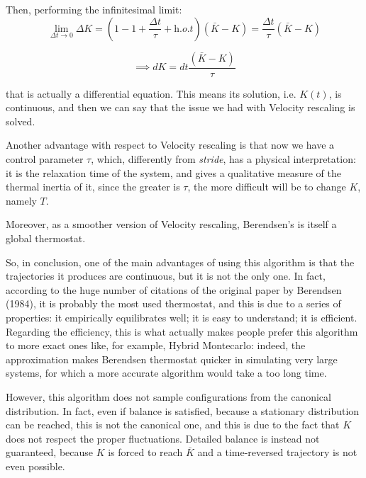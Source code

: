 Then, performing the infinitesimal limit:
\begin{equation*}
    \lim_{{\Delta t}\to 0} \Delta K = (1-1+\frac{\Delta t}{\tau} + \textit{h.o.t})(\bar K-K)=\frac{\Delta t}{\tau}(\bar K-K)
\end{equation*}

\begin{equation}
    \implies dK=dt \frac{(\bar K-K)}{\tau}
\end{equation}

that is actually a differential equation. This means its solution, i.e. $K(t)$, is continuous, and then we can say that the issue we had with Velocity rescaling is solved.

Another advantage with respect to Velocity rescaling is that now we have a control parameter $\tau$, which, differently from \textit{stride}, has a physical interpretation:
it is the relaxation time of the system, and gives a qualitative measure of the thermal inertia of it, since the greater is $\tau$, the more difficult will be to change $K$, namely $T$.

Moreover, as a smoother version of Velocity rescaling, Berendsen's is itself a global thermostat.

So, in conclusion, one of the main advantages of using this algorithm is that the trajectories it produces are continuous, but it is not the only one. In fact, according to the huge number of citations of the original paper by Berendsen (1984), it is probably the most used thermostat, and this is due to a series of properties: it empirically equilibrates well; it is easy to understand; it is efficient. Regarding the efficiency, this is what actually makes people prefer this algorithm to more exact ones like, for example, Hybrid Montecarlo: indeed, the approximation makes Berendsen thermostat quicker in simulating very large systems, for  which a more accurate algorithm would take a too long time.

However, this algorithm does not sample configurations from the canonical distribution. In fact, even if balance is satisfied, because a stationary distribution can be reached, this is not the canonical one, and this is due to the fact that $K$ does not respect the proper fluctuations. Detailed balance is instead not guaranteed, because $K$ is forced to reach $\bar K$ and a time-reversed trajectory is not even possible.



